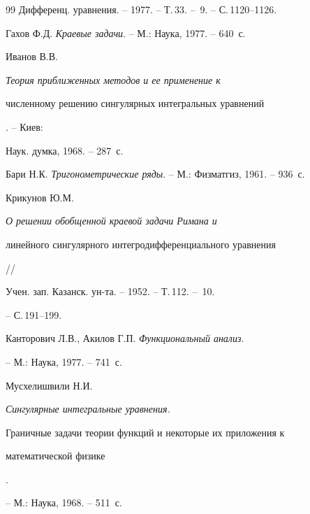 \begin{thebibliography}{99}
Дифференц. уравнения. -- 1977. -- Т.\,33. -- \No\,9. -- С.\,1120--1126.




Гахов Ф.Д. {\em Краевые задачи}. -- М.: Наука, 1977. -- 640~с.




Иванов В.В. {\em Теория приближенных методов и ее применение к


численному решению сингулярных интегральных уравнений}. -- Киев:


Наук. думка, 1968. -- 287~с.




Бари Н.К. {\em Тригонометрические ряды}. -- М.: Физматгиз, 1961. -- 936~с.




Крикунов Ю.М. {\em О решении обобщенной краевой задачи Римана и


линейного сингулярного интегродифференциального уравнения} //


Учен. зап. Казанск. ун-та. -- 1952. -- Т.\,112. -- \No\,10.


-- С.\,191--199.




Канторович Л.В., Акилов Г.П. {\em Функциональный анализ}.


-- М.: Наука, 1977. -- 741~с.




Мусхелишвили Н.И. {\em Сингулярные интегральные уравнения. 


Граничные задачи теории функций и некоторые их приложения к


математической физике}.


-- М.: Наука, 1968. -- 511~с.





\end{thebibliography}





\vskip 2cm














\label{end}















